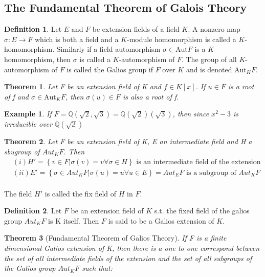 \documentclass{book}
\newtheorem{theorem}{Theorem}[section]
\newtheorem{example}{Example}[section]
\theoremstyle{definition}
\newtheorem{definition}{Definition}[section]
\begin{document}
\subsection{The Fundamental Theorem of Galois Theory}
\begin{definition}
Let $E$ and $F$ be extension fields of a field $K$. A nonzero map $\sigma:E\longrightarrow F$ which is both a field and a $K$-module homomorphism is called a $K$-homomorphism. Similarly if a field automorphism $\sigma\in \text{Aut}F$ is a $K$-homomorphism, then $\sigma$ is called a $K$-automorphism of $F$. The group of all $K$-automorphism of $F$ is called the Galios group if $F$ over $K$ and is denoted $\text{Aut}_KF$.
\end{definition}
\begin{theorem}
Let F be an extension field of K and $f\in K[x]$. If $u\in F$ is a root of f and $\sigma\in\text{Aut}_KF$, then $\sigma(u)\in F$ is also a root of f.
\end{theorem}

\begin{example}
If $F=\mathbb{Q}(\sqrt2,\sqrt3)=\mathbb{Q}(\sqrt2)(\sqrt3)$, then since $x^2-3$ is irreducible over $\mathbb{Q(\sqrt2)}$

\end{example}

\begin{theorem}
Let F be an extension field of K, E an intermediate field and H a sbugroup of $Aut_KF$. Then
\begin{align*}
&(i)H'=\left\{ v\in F|\sigma(v)=v \forall \sigma\in H \right\}\text{ is an intermediate field of the extension}\\
&(ii)E'=\left\{ \sigma\in Aut_KF|\sigma(u)=u \forall u\in E \right\}=Aut_EF\text{ is a subgroup of }Aut_KF\\
\end{align*}

\end{theorem}
The field $H'$ is called the fix field of $H$ in $F$.
\begin{definition}
Let $F$ be an extension field of $K$ s.t. the fixed field of the galios group  $Aut_KF$ is K itself. Then $F$ is said to be a Galios extension of $K$.
\end{definition}

\begin{theorem}[Fundamental Theorem of Galios Theory]
If F is a finite dimensional Galios extension of K, then there is a one to one correspond between the set of all intermediate fields of the extension and the set of all subgroups of the Galios group $Aut_KF$ such that:
\end{theorem}
\end{document}
